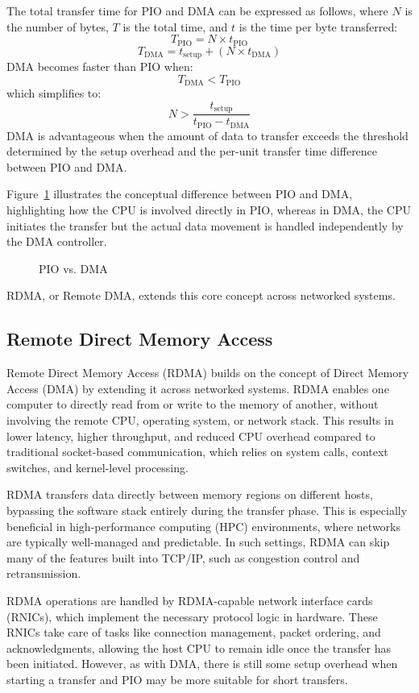 The total transfer time for PIO and DMA can be expressed as follows, where $N$ is the number of bytes, $T$  is the total time, and $t$ is the time per byte transferred:
\[
T_{\text{PIO}} = N \times t_{\text{PIO}}
\]
\vspace{-2em}
\[
T_{\text{DMA}} = t_{\text{setup}} + (N \times t_{\text{DMA}})
\]
DMA becomes faster than PIO when:
\[
T_{\text{DMA}} < T_{\text{PIO}}
\]
which simplifies to:
\[
N > \frac{t_{\text{setup}}}{t_{\text{PIO}} - t_{\text{DMA}}}
\]
DMA is advantageous when the amount of data to transfer exceeds the threshold determined by the setup overhead and the per-unit transfer time difference between PIO and DMA.

Figure~\ref{fig:dmapio} illustrates the conceptual difference between PIO and DMA, highlighting how the CPU is involved directly in PIO, whereas in DMA, the CPU initiates the transfer but the actual data movement is handled independently by the DMA controller.

\begin{figure}[H]
    \centering
    
    \caption{PIO vs. DMA}
    \label{fig:dmapio}
\end{figure}

RDMA, or Remote DMA, extends this core concept across networked systems.

\subsection{Remote Direct Memory Access}

Remote Direct Memory Access (RDMA) builds on the concept of Direct Memory Access (DMA) by extending it across networked systems. RDMA enables one computer to directly read from or write to the memory of another, without involving the remote CPU, operating system, or network stack. This results in lower latency, higher throughput, and reduced CPU overhead compared to traditional socket-based communication, which relies on system calls, context switches, and kernel-level processing.

RDMA transfers data directly between memory regions on different hosts, bypassing the software stack entirely during the transfer phase. This is especially beneficial in high-performance computing (HPC) environments, where networks are typically well-managed and predictable. In such settings, RDMA can skip many of the features built into TCP/IP, such as congestion control and retransmission.

RDMA operations are handled by RDMA-capable network interface cards (RNICs), which implement the necessary protocol logic in hardware. These RNICs take care of tasks like connection management, packet ordering, and acknowledgments, allowing the host CPU to remain idle once the transfer has been initiated. However, as with DMA, there is still some setup overhead when starting a transfer and PIO may be more suitable for short transfers.

